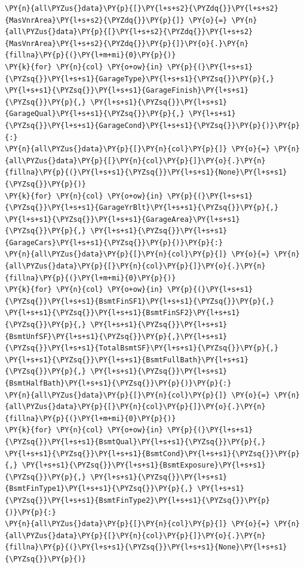 \documentclass[no-math]{YangThesis}
\begin{document}
\begin{tcolorbox}[breakable, size=fbox, boxrule=1pt, pad at break*=1mm,colback=cellbackground, colframe=cellborder]
\begin{Verbatim}[commandchars=\\\{\}]
\PY{n}{all\PYZus{}data}\PY{p}{[}\PY{l+s+s2}{\PYZdq{}}\PY{l+s+s2}{MasVnrArea}\PY{l+s+s2}{\PYZdq{}}\PY{p}{]} \PY{o}{=} \PY{n}{all\PYZus{}data}\PY{p}{[}\PY{l+s+s2}{\PYZdq{}}\PY{l+s+s2}{MasVnrArea}\PY{l+s+s2}{\PYZdq{}}\PY{p}{]}\PY{o}{.}\PY{n}{fillna}\PY{p}{(}\PY{l+m+mi}{0}\PY{p}{)}
\PY{k}{for} \PY{n}{col} \PY{o+ow}{in} \PY{p}{(}\PY{l+s+s1}{\PYZsq{}}\PY{l+s+s1}{GarageType}\PY{l+s+s1}{\PYZsq{}}\PY{p}{,} \PY{l+s+s1}{\PYZsq{}}\PY{l+s+s1}{GarageFinish}\PY{l+s+s1}{\PYZsq{}}\PY{p}{,} \PY{l+s+s1}{\PYZsq{}}\PY{l+s+s1}{GarageQual}\PY{l+s+s1}{\PYZsq{}}\PY{p}{,} \PY{l+s+s1}{\PYZsq{}}\PY{l+s+s1}{GarageCond}\PY{l+s+s1}{\PYZsq{}}\PY{p}{)}\PY{p}{:}
\PY{n}{all\PYZus{}data}\PY{p}{[}\PY{n}{col}\PY{p}{]} \PY{o}{=} \PY{n}{all\PYZus{}data}\PY{p}{[}\PY{n}{col}\PY{p}{]}\PY{o}{.}\PY{n}{fillna}\PY{p}{(}\PY{l+s+s1}{\PYZsq{}}\PY{l+s+s1}{None}\PY{l+s+s1}{\PYZsq{}}\PY{p}{)}
\PY{k}{for} \PY{n}{col} \PY{o+ow}{in} \PY{p}{(}\PY{l+s+s1}{\PYZsq{}}\PY{l+s+s1}{GarageYrBlt}\PY{l+s+s1}{\PYZsq{}}\PY{p}{,} \PY{l+s+s1}{\PYZsq{}}\PY{l+s+s1}{GarageArea}\PY{l+s+s1}{\PYZsq{}}\PY{p}{,} \PY{l+s+s1}{\PYZsq{}}\PY{l+s+s1}{GarageCars}\PY{l+s+s1}{\PYZsq{}}\PY{p}{)}\PY{p}{:}
\PY{n}{all\PYZus{}data}\PY{p}{[}\PY{n}{col}\PY{p}{]} \PY{o}{=} \PY{n}{all\PYZus{}data}\PY{p}{[}\PY{n}{col}\PY{p}{]}\PY{o}{.}\PY{n}{fillna}\PY{p}{(}\PY{l+m+mi}{0}\PY{p}{)}
\PY{k}{for} \PY{n}{col} \PY{o+ow}{in} \PY{p}{(}\PY{l+s+s1}{\PYZsq{}}\PY{l+s+s1}{BsmtFinSF1}\PY{l+s+s1}{\PYZsq{}}\PY{p}{,} \PY{l+s+s1}{\PYZsq{}}\PY{l+s+s1}{BsmtFinSF2}\PY{l+s+s1}{\PYZsq{}}\PY{p}{,} \PY{l+s+s1}{\PYZsq{}}\PY{l+s+s1}{BsmtUnfSF}\PY{l+s+s1}{\PYZsq{}}\PY{p}{,}\PY{l+s+s1}{\PYZsq{}}\PY{l+s+s1}{TotalBsmtSF}\PY{l+s+s1}{\PYZsq{}}\PY{p}{,} \PY{l+s+s1}{\PYZsq{}}\PY{l+s+s1}{BsmtFullBath}\PY{l+s+s1}{\PYZsq{}}\PY{p}{,} \PY{l+s+s1}{\PYZsq{}}\PY{l+s+s1}{BsmtHalfBath}\PY{l+s+s1}{\PYZsq{}}\PY{p}{)}\PY{p}{:}
\PY{n}{all\PYZus{}data}\PY{p}{[}\PY{n}{col}\PY{p}{]} \PY{o}{=} \PY{n}{all\PYZus{}data}\PY{p}{[}\PY{n}{col}\PY{p}{]}\PY{o}{.}\PY{n}{fillna}\PY{p}{(}\PY{l+m+mi}{0}\PY{p}{)}
\PY{k}{for} \PY{n}{col} \PY{o+ow}{in} \PY{p}{(}\PY{l+s+s1}{\PYZsq{}}\PY{l+s+s1}{BsmtQual}\PY{l+s+s1}{\PYZsq{}}\PY{p}{,} \PY{l+s+s1}{\PYZsq{}}\PY{l+s+s1}{BsmtCond}\PY{l+s+s1}{\PYZsq{}}\PY{p}{,} \PY{l+s+s1}{\PYZsq{}}\PY{l+s+s1}{BsmtExposure}\PY{l+s+s1}{\PYZsq{}}\PY{p}{,} \PY{l+s+s1}{\PYZsq{}}\PY{l+s+s1}{BsmtFinType1}\PY{l+s+s1}{\PYZsq{}}\PY{p}{,} \PY{l+s+s1}{\PYZsq{}}\PY{l+s+s1}{BsmtFinType2}\PY{l+s+s1}{\PYZsq{}}\PY{p}{)}\PY{p}{:}
\PY{n}{all\PYZus{}data}\PY{p}{[}\PY{n}{col}\PY{p}{]} \PY{o}{=} \PY{n}{all\PYZus{}data}\PY{p}{[}\PY{n}{col}\PY{p}{]}\PY{o}{.}\PY{n}{fillna}\PY{p}{(}\PY{l+s+s1}{\PYZsq{}}\PY{l+s+s1}{None}\PY{l+s+s1}{\PYZsq{}}\PY{p}{)}
	\end{Verbatim}
\end{tcolorbox}
\end{document}
